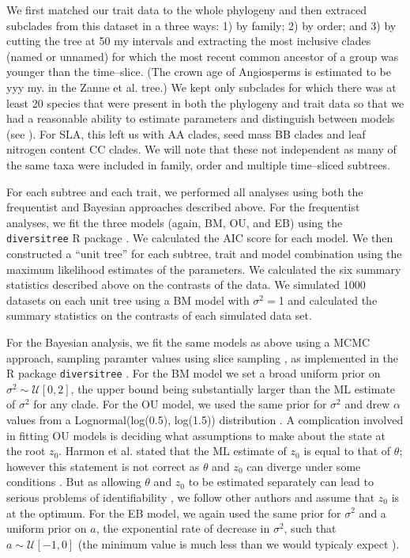 \documentclass[a4paper,12pt]{article}
\begin{document}
We first matched our trait data to the whole phylogeny and then extraced subclades from this dataset in a three ways: 1) by family; 2) by order; and 3) by cutting the tree at 50 my intervals and extracting the most inclusive clades (named or unnamed) for which the most recent common ancestor of a group was younger than the time--slice. (The crown age of Angiosperms is estimated to be yyy my. in the Zanne et al. tree.) We kept only subclades for which there was at least 20 species that were present in both the phylogeny and trait data so that we had a reasonable ability to estimate parameters and distinguish between models (see \citep{Boettiger2012, SlaterPennell}). For SLA, this left us with AA clades, seed mass BB clades and leaf nitrogen content CC clades. We will note that these not independent as many of the same taxa were included in family, order and multiple time--sliced subtrees. 

For each subtree and each trait, we performed all analyses using both the frequentist and Bayesian approaches described above. For the frequentist analyses, we fit the three models (again, BM, OU, and EB) using the \texttt{diversitree} R package \citep{FitzJohn2012}. We calculated the AIC \citep{Akaike1974} score for each model. We then constructed a ``unit tree'' for each subtree, trait and model combination using the maximum likelihood estimates of the parameters. We calculated the six summary statistics described above on the contrasts of the data. We simulated 1000 datasets on each unit tree using a BM model with $\sigma^2=$1 and calculated the summary statistics on the contrasts of each simulated data set. 

For the Bayesian analysis, we fit the same models as above using a MCMC approach, sampling paramter values using slice sampling \citep{Nealslice}, as implemented in the R package \texttt{diversitree} \citep{FitzJohn2012}. For the BM model we set a broad uniform prior on $\sigma^2 \sim \mathcal{U}[0, 2]$, the upper bound being substantially larger than the ML estimate of $\sigma^2$ for any clade. For the OU model, we used the same prior for $\sigma^2$ and drew $\alpha$ values from a Lognormal(log(0.5), log(1.5)) distribution \citep{UyedaBayou}. A complication involved in fitting OU models is deciding what assumptions to make about the state at the root $z_0$. Harmon et al. \citep{Harmon2010} stated that the ML estimate of $z_0$ is equal to that of $\theta$; however this statement is not correct as $\theta$ and $z_0$ can diverge under some conditions \citep{HoAne2012}. But as allowing $\theta$ and $z_0$ to be estimated separately can lead to serious problems of identifiability \citep{HoAne2012}, we follow other authors \citep{ButlerKing2004, Beaulieu2012} and assume that $z_0$ is at the optimum. For the EB model, we again used the same prior for $\sigma^2$ and a uniform prior on $a$, the exponential rate of decrease in $\sigma^2$, such that $a \sim \mathcal{U}[-1, 0]$ (the minimum value is much less than we would typicaly expect \citep{SlaterPennell}).
\end{document}

